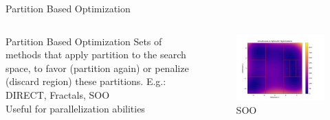     
\begin{frame}{Partition Based Optimization}

    \begin{columns}
        \begin{column}{0.5\textwidth}
            \begin{block}{Partition Based Optimization}
                Sets of methods that apply partition to the search space, to favor (partition again) or penalize (discard region) these partitions.  E.g.: DIRECT\cite{jones1993direct}, Fractals\cite{firmin:hal-04474444}, SOO\cite{munos2011soo}\\

                Useful for parallelization abilities
            \end{block}
        \end{column}

        \begin{column}{0.5\textwidth}
            \begin{figure}
                \centering
                \includegraphics[width=\linewidth]{imgs/plots/soo.jpg}
                \caption{SOO}
            \end{figure}
        \end{column}
    \end{columns}

\end{frame}


